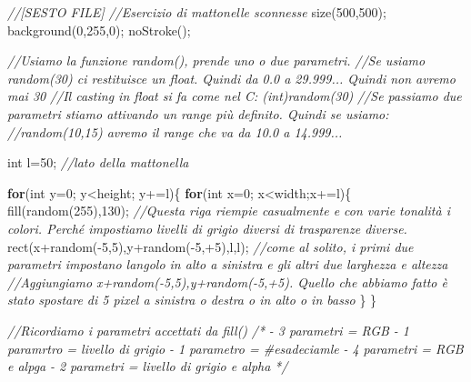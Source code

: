 \documentclass[
]{article}
\newenvironment{Shaded}{}{}
\newcommand{\CommentTok}[1]{\textcolor[rgb]{0.38,0.63,0.69}{\textit{#1}}}
\newcommand{\ControlFlowTok}[1]{\textcolor[rgb]{0.00,0.44,0.13}{\textbf{#1}}}
\newcommand{\DataTypeTok}[1]{\textcolor[rgb]{0.56,0.13,0.00}{#1}}
\newcommand{\DecValTok}[1]{\textcolor[rgb]{0.25,0.63,0.44}{#1}}
\newcommand{\FunctionTok}[1]{\textcolor[rgb]{0.02,0.16,0.49}{#1}}
\newcommand{\NormalTok}[1]{#1}
\newcommand{\OperatorTok}[1]{\textcolor[rgb]{0.40,0.40,0.40}{#1}}
\begin{document}
\begin{Shaded}
\begin{Highlighting}[]
\CommentTok{//[SESTO FILE]}
\CommentTok{//Esercizio di mattonelle sconnesse}
\FunctionTok{size}\OperatorTok{(}\DecValTok{500}\OperatorTok{,}\DecValTok{500}\OperatorTok{);}
\FunctionTok{background}\OperatorTok{(}\DecValTok{0}\OperatorTok{,}\DecValTok{255}\OperatorTok{,}\DecValTok{0}\OperatorTok{);}
\FunctionTok{noStroke}\OperatorTok{();}

\CommentTok{//Usiamo la funzione \textquotesingle{}random()\textquotesingle{}, prende uno o due parametri.}
\CommentTok{//Se usiamo random(30) ci restituisce un float. Quindi da 0.0 a 29.999... Quindi non avremo mai 30}
\CommentTok{//Il casting in float si fa come nel C: (int)random(30)}
\CommentTok{//Se passiamo due parametri stiamo attivando un range più definito. Quindi se usiamo:}
\CommentTok{//random(10,15) avremo il range che va da 10.0 a 14.999...}

\DataTypeTok{int}\NormalTok{ l}\OperatorTok{=}\DecValTok{50}\OperatorTok{;} \CommentTok{//lato della mattonella}

\ControlFlowTok{for}\OperatorTok{(}\DataTypeTok{int}\NormalTok{ y}\OperatorTok{=}\DecValTok{0}\OperatorTok{;}\NormalTok{ y}\OperatorTok{\textless{}}\NormalTok{height}\OperatorTok{;}\NormalTok{ y}\OperatorTok{+=}\NormalTok{l}\OperatorTok{)\{}
  \ControlFlowTok{for}\OperatorTok{(}\DataTypeTok{int}\NormalTok{ x}\OperatorTok{=}\DecValTok{0}\OperatorTok{;}\NormalTok{ x}\OperatorTok{\textless{}}\NormalTok{width}\OperatorTok{;}\NormalTok{x}\OperatorTok{+=}\NormalTok{l}\OperatorTok{)\{}
    \FunctionTok{fill}\OperatorTok{(}\FunctionTok{random}\OperatorTok{(}\DecValTok{255}\OperatorTok{),}\DecValTok{130}\OperatorTok{);} \CommentTok{//Questa riga riempie casualmente e con varie tonalità i colori. Perché impostiamo livelli di grigio diversi di trasparenze diverse.}
    \FunctionTok{rect}\OperatorTok{(}\NormalTok{x}\OperatorTok{+}\FunctionTok{random}\OperatorTok{({-}}\DecValTok{5}\OperatorTok{,}\DecValTok{5}\OperatorTok{),}\NormalTok{y}\OperatorTok{+}\FunctionTok{random}\OperatorTok{({-}}\DecValTok{5}\OperatorTok{,+}\DecValTok{5}\OperatorTok{),}\NormalTok{l}\OperatorTok{,}\NormalTok{l}\OperatorTok{);} \CommentTok{//come al solito, i primi due parametri impostano l\textquotesingle{}angolo in alto a sinistra e gli altri due larghezza e altezza}
    \CommentTok{//Aggiungiamo \textquotesingle{}x+random({-}5,5),y+random({-}5,+5)\textquotesingle{}. Quello che abbiamo fatto è stato spostare di 5 pixel a sinistra o destra o in alto o in basso}
  \OperatorTok{\}}
\OperatorTok{\}}

\CommentTok{//Ricordiamo i parametri accettati da \textquotesingle{}fill()\textquotesingle{}}
\CommentTok{/*}
\CommentTok{{-} 3 parametri = RGB}
\CommentTok{{-} 1 paramrtro = livello di grigio}
\CommentTok{{-} 1 parametro = \#esadeciamle}
\CommentTok{{-} 4 parametri = RGB e alpga}
\CommentTok{{-} 2 parametri = livello di grigio e alpha}
\CommentTok{*/}
\end{Highlighting}
\end{Shaded}
\end{document}

